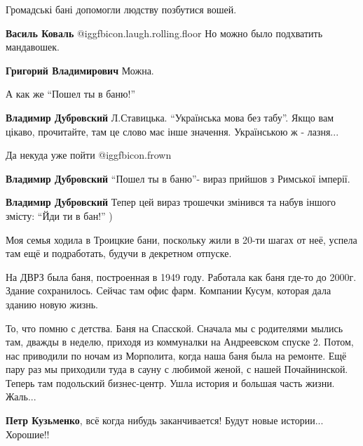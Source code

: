 \begin{itemize}

Громадські бані допомогли людству позбутися вошей.

\begin{itemize} %
\textbf{Василь Коваль}  @igg{fbicon.laugh.rolling.floor} Но можно было подхватить мандавошек.

\textbf{Григорий Владимирович} Можна.
\end{itemize} %

А как же \enquote{Пошел ты в баню!}

\begin{itemize} %
\textbf{Владимир Дубровский} Л.Ставицька. \enquote{Українська мова без табу}. Якщо вам цікаво, прочитайте, там це слово має інше значення. Українською ж - лазня...

Да некуда уже пойти  @igg{fbicon.frown} 

\textbf{Владимир Дубровский} \enquote{Пошел ты в баню}- вираз прийшов з Римської імперії.

\textbf{Владимир Дубровский} Тепер цей вираз трошечки змінився та набув іншого змісту: \enquote{Йди ти в бан!} )
\end{itemize} %

Моя семья ходила в Троицкие бани, поскольку жили в 20-ти шагах от неё, успела там ещё и подработать, будучи в декретном отпуске.


На ДВРЗ была баня, построенная в 1949 году. Работала как баня где-то до 2000г.
Здание сохранилось. Сейчас там офис фарм. Компании Кусум, которая дала зданию
новую жизнь.



То, что помню с детства. Баня на Спасской. Сначала мы с родителями мылись там,
дважды в неделю, приходя из коммуналки на Андреевском спуске 2. Потом, нас
приводили по ночам из Морполита, когда наша баня была на ремонте. Ещё пару раз
мы приходили туда в сауну с любимой женой, с нашей Почайнинской. Теперь там
подольский бизнес-центр. Ушла история и большая часть жизни. Жаль...

\begin{itemize} %
\textbf{Петр Кузьменко}, всё когда нибудь заканчивается! Будут новые истории... Хорошие!!



\end{itemize}
\end{itemize}
